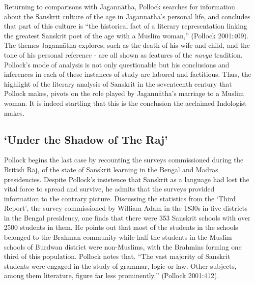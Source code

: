 Returning to comparisons with Jagannātha, Pollock searches for information about the Sanskrit culture of the age in Jagannātha’s personal life, and concludes that part of this culture is “the historical fact of a literary representation linking the greatest Sanskrit poet of the age with a Muslim woman,” (Pollock 2001:409). The themes Jagannātha explores, such as the death of his wife and child, and the tone of his personal reference  - are all shown as features of the {\sl navya} tradition. Pollock’s mode of analysis is not only questionable but his conclusions and inferences in each of these instances of study are labored and factitious. Thus, the highlight of the literary analysis of Sanskrit in the seventeenth century that Pollock makes, pivots on the role played by Jagannātha’s marriage to a Muslim woman. It is indeed startling that this is the conclusion the acclaimed Indologist makes.

\subsection{‘Under the Shadow of The Raj’}

Pollock begins the last case by recounting the surveys commissioned during the British Rāj, of the state of Sanskrit learning in the Bengal and Madras presidencies. Despite Pollock’s insistence that Sanskrit as a language had lost the vital force to spread and survive, he admits that the surveys provided information to the contrary picture. Discussing the statistics from the ‘Third Report’, the survey commissioned by William Adam in the 1830s in five districts in the Bengal presidency, one finds that there were 353 Sanskrit schools with over 2500 students in them. He points out that most of the students in the schools belonged to the Brahman community while half the students in the Muslim schools of Burdwan district were non-Muslims, with the Brahmins forming one third of this population. Pollock notes that, “The vast majority of Sanskrit students were engaged in the study of grammar, logic or law. Other subjects, among them literature, figure far less prominently,” (Pollock 2001:412).

